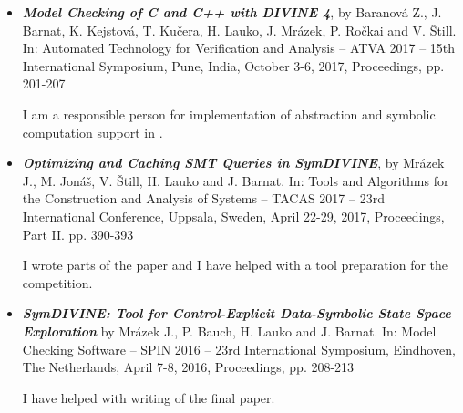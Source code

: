 \begin{itemize}

\item \textbf{\emph{Model Checking of C and C++ with DIVINE 4}},
by Baranová Z., J. Barnat, K. Kejstová, T. Kučera, H. Lauko, J. Mrázek, P. Ročkai and V. Štill.
In: Automated Technology for Verification and Analysis -- ATVA 2017 --
15th International Symposium, Pune, India, October 3-6, 2017,
Proceedings, pp. 201-207~\cite{Divine17}

I am a responsible person for implementation of abstraction and symbolic
computation support in .

\item \emph{\textbf{Optimizing and Caching SMT Queries in SymDIVINE}},
by Mrázek J., M. Jonáš, V. Štill, H. Lauko and J. Barnat.
In: Tools and Algorithms for the Construction and Analysis of Systems -- TACAS 2017 --
23rd International Conference, Uppsala, Sweden, April 22-29, 2017,
Proceedings, Part II. pp. 390-393~\cite{Mrazek2017}

I wrote parts of the paper and I have helped with a tool preparation for the
\svcomp competition.

\item \textbf{\emph{\textsf{SymDIVINE}: Tool for Control-Explicit Data-Symbolic State Space Exploration}}
by Mrázek J., P. Bauch, H. Lauko and J. Barnat.
In: Model Checking Software -- SPIN 2016 -- 23rd International Symposium, Eindhoven, The Netherlands, April 7-8, 2016, Proceedings, pp. 208-213~\cite{Mrazek2016}

I have helped with writing of the final paper.

\end{itemize}
